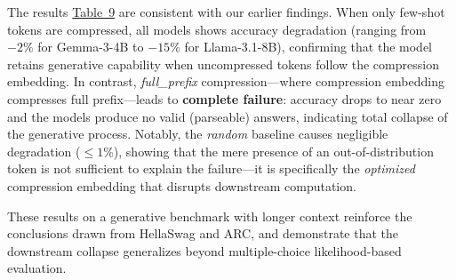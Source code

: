 The results \href{https://drive.google.com/file/d/1_NJSBkvhEyUdA45HD2QD8IxIEaQEpb9t/view?usp=sharing}{Table~9} are consistent with our earlier findings. When only few-shot tokens are
compressed, all models shows accuracy degradation (ranging from
$-2\%$ for Gemma-3-4B to $-15\%$ for Llama-3.1-8B), confirming that the model retains
generative capability when uncompressed tokens follow the compression embedding. In
contrast, \textit{full\_prefix} compression---where compression embedding compresses full prefix---leads to \textbf{complete failure}: accuracy drops to
near zero and the models produce no valid (parseable) answers, indicating total collapse
of the generative process. Notably, the \textit{random} baseline causes negligible
degradation ($\leq 1\%$), showing that the mere presence of an out-of-distribution
token is not sufficient to explain the failure---it is specifically the \emph{optimized}
compression embedding that disrupts downstream computation.

These results on a generative benchmark with longer context reinforce the conclusions
drawn from HellaSwag and ARC, and demonstrate that the downstream collapse generalizes
beyond multiple-choice likelihood-based evaluation.


